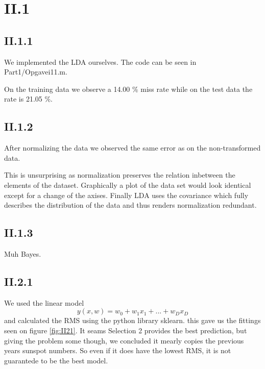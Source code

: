 \documentclass{article}
\begin{document}
\section{II.1}

\subsection{II.1.1}

We implemented the LDA ourselves. The code can be seen in
Part1/Opgavei11.m. 

On the training data we observe a 14.00 \% miss rate while on the test data
the rate is 21.05 \%.

\subsection{II.1.2}

After normalizing the data we observed the same error as on the
non-transformed data. 

This is unsurprising as normalization preserves the relation inbetween
the elements of the dataset. Graphically a plot of the data set would
look identical except for a change of the axises. Finally LDA uses the
covariance which fully describes the distribution of the data and thus
renders normalization redundant.

\subsection{II.1.3}

Muh Bayes.


\subsection{II.2.1}

We used the linear model
\begin{equation}
    y(x, w) = w_0 + w_1 x_1 + ... + w_D x_D
\end{equation}
and calculated the RMS using the python library sklearn. this gave us the fittings seen on 
figure \ref{fig:II21}. It seams Selection 2 provides the best prediction, but giving the problem some though, we concluded it mearly copies
the previous years sunspot numbers. So even if it does have the lowest RMS, it is not guarantede to be the best model.
\end{document}
